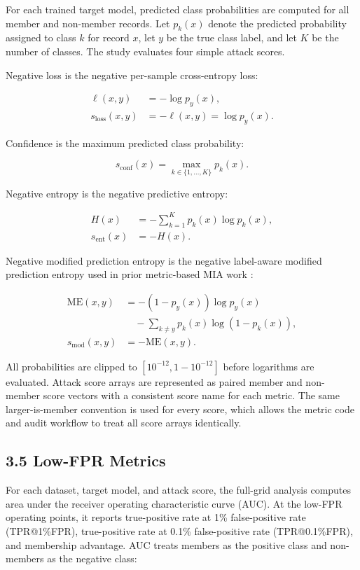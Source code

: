 \documentclass[
  10pt,
  twocolumn]{article}
\begin{document}
For each trained target model, predicted class probabilities are computed for all member and non-member records. Let \(p_k(x)\) denote the predicted probability assigned to class \(k\) for record \(x\), let \(y\) be the true class label, and let \(K\) be the number of classes. The study evaluates four simple attack scores.

Negative loss is the negative per-sample cross-entropy loss:

\[
\begin{aligned}
\ell(x,y) &= -\log p_y(x),\\
s_{\mathrm{loss}}(x,y) &= -\ell(x,y) = \log p_y(x).
\end{aligned}
\]

Confidence is the maximum predicted class probability:

\[
s_{\mathrm{conf}}(x) = \max_{k \in \{1,\ldots,K\}} p_k(x).
\]

Negative entropy is the negative predictive entropy:

\[
\begin{aligned}
H(x)
&= -\sum_{k=1}^{K} p_k(x)\log p_k(x),\\
s_{\mathrm{ent}}(x)
&= -H(x).
\end{aligned}
\]

Negative modified prediction entropy is the negative label-aware modified prediction entropy used in prior metric-based MIA work \cite{ref-24}:

\[
\begin{aligned}
\mathrm{ME}(x,y)
&= -(1-p_y(x))\log p_y(x)\\
&\quad - \sum_{k \ne y} p_k(x)\log(1-p_k(x)),\\
s_{\mathrm{mod}}(x,y)
&= -\mathrm{ME}(x,y).
\end{aligned}
\]

All probabilities are clipped to \([10^{-12}, 1-10^{-12}]\) before logarithms are evaluated. Attack score arrays are represented as paired member and non-member score vectors with a consistent score name for each metric. The same larger-is-member convention is used for every score, which allows the metric code and audit workflow to treat all score arrays identically.

\hypertarget{low-fpr-metrics}{%
\subsection{3.5 Low-FPR Metrics}\label{low-fpr-metrics}}

For each dataset, target model, and attack score, the full-grid analysis computes area under the receiver operating characteristic curve (AUC). At the low-FPR operating points, it reports true-positive rate at 1\% false-positive rate (TPR@1\%FPR), true-positive rate at 0.1\% false-positive rate (TPR@0.1\%FPR), and membership advantage. AUC treats members as the positive class and non-members as the negative class:
\end{document}
